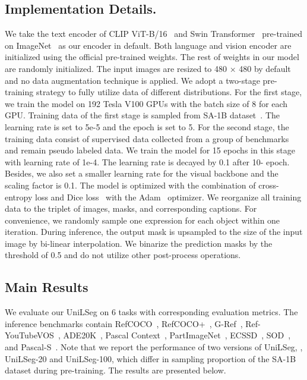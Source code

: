 \documentclass[10pt,twocolumn,letterpaper]{article}
\newcommand{\MethodName}{UniLSeg\xspace}
\begin{document}
\subsection{Implementation Details.}
We take the text encoder of CLIP ViT-B/16~\cite{CLIP} and Swin Transformer~\cite{swin} pre-trained on ImageNet~\cite{imagenet} as our encoder in default.
Both language and vision encoder are initialized using the official pre-trained weights. The rest of weights in our model are randomly initialized.
The input images are resized to 480 × 480 by default and no data augmentation technique is applied.
We adopt a two-stage pre-training strategy to fully utilize data of different distributions.
For the first stage, we train the model on 192 Tesla V100 GPUs with the batch size of 8 for each GPU. Training data of the first stage is sampled from SA-1B dataset~\cite{sam}. The learning rate is set to 5e-5 and the epoch is set to 5.
For the second stage, the training data consist of supervised data collected from a group of benchmarks and remain pseudo labeled data. We train the model for 15 epochs in this stage with  learning rate of 1e-4. The learning rate is decayed by 0.1 after 10- epoch.
Besides, we also set a smaller learning rate for the visual backbone and the scaling factor is 0.1.
The model is optimized with the combination of  cross-entropy loss and Dice loss~\cite{dice-loss} with the Adam~\cite{adam} optimizer.
We reorganize all training data to the triplet of images, masks, and corresponding captions. For convenience, we randomly sample one expression for each object within one iteration.
During inference, the output mask is upsampled to the size of the input image by bi-linear interpolation. We binarize the prediction masks by the threshold of 0.5 and do not utilize other post-process operations.


\subsection{Main Results}
We evaluate our \MethodName on 6 tasks with corresponding evaluation metrics. The inference benchmarks contain RefCOCO~\cite{refcoco}, RefCOCO+~\cite{refcoco}, G-Ref~\cite{grefcoco}, Ref-YouTubeVOS~\cite{urvos}, ADE20K~\cite{ade20k}, Pascal Context~\cite{pascal-voc}, PartImageNet~\cite{partimagenet}, ECSSD~\cite{ECSSD}, SOD~\cite{sod1}, and Pascal-S~\cite{pascal}. 
Note that we report the performance of two versions of \MethodName, \ie, \MethodName-20 and \MethodName-100, which differ in sampling proportion of the SA-1B dataset during pre-training.
The results are presented below.
\end{document}
